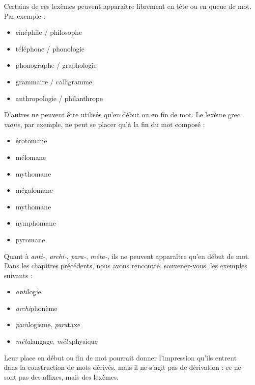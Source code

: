 Certains de ces lexèmes peuvent apparaître librement en tête ou en queue de mot. Par exemple :
\begin{itemize}
\item cinéphile / philosophe
\item téléphone / phonologie
\item phonographe / graphologie
\item grammaire / calligramme
\item anthropologie / philanthrope
\end{itemize}
D’autres ne peuvent être utilisés qu’en début ou en fin de mot. Le lexème grec \textit{mane}, par exemple, ne peut se placer qu’à la fin du mot composé :
\begin{itemize}
\item érotomane
\item mélomane
\item mythomane
\item mégalomane
\item mythomane
\end{itemize}
\begin{itemize}
\item nymphomane
\item pyromane
\end{itemize}
Quant à \textit{anti-}, \textit{archi-}, \textit{para-}, \textit{méta-}, ils ne peuvent apparaître qu’en début de mot. Dans les chapitres précédents, nous avons rencontré, souvenez-vous, les exemples suivants :
\begin{itemize}
\item \textit{anti}logie
\item \textit{archi}phonème
\item \textit{para}logisme, \textit{para}taxe
\item \textit{méta}langage, \textit{méta}physique
\end{itemize}
Leur place en début ou fin de mot pourrait donner l’impression qu’ils entrent dans la construction de mots dérivés, mais il ne s’agit pas de dérivation : ce ne sont pas des affixes, mais des lexèmes.

